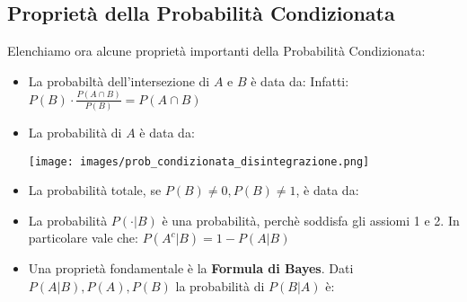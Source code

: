 \subsection{Proprietà della Probabilità Condizionata}
Elenchiamo ora alcune proprietà importanti della Probabilità Condizionata:
\begin{itemize}
    \item La probabiltà dell'intersezione di $A$ e $B$ è data da:
        Infatti:
        $P(B) \cdot \frac{P(A \cap B)}{P(B)} = P(A\cap B)$
    
    \item La probabilità di $A$ è data da:
        \begin{center}
            \texttt{[image: images/prob\_condizionata\_disintegrazione.png]}
        \end{center}
    \item La probabilità totale, se $P(B)\neq 0, P(B)\neq 1$, è data da:
    \item La probabilità $P(\cdot |B)$ è una probabilità, perchè soddisfa gli assiomi 1 e 2.
        In particolare vale che: $P(A^c|B) = 1 - P(A|B)$
    \item Una proprietà fondamentale è la \textbf{Formula di Bayes}. Dati $P(A|B), P(A),P(B)$ la probabilità di $P(B|A)$ è:

\end{itemize}


